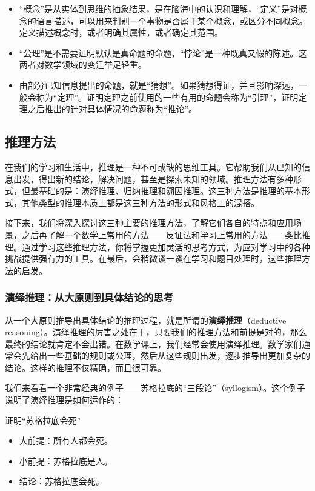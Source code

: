 \begin{itemize}
\item “概念”是从实体到思维的抽象结果，是在脑海中的认识和理解，“定义”是对概念的语言描述，可以用来判别一个事物是否属于某个概念，或区分不同概念。定义描述概念时，或者明确其属性，或者确定其范围。
\item “公理”是不需要证明默认是真命题的命题，“悖论”是一种既真又假的陈述。这两者对数学领域的变迁举足轻重。
\item 由部分已知信息提出的命题，就是“猜想”。如果猜想得证，并且影响深远，一般会称为“定理”。证明定理之前使用的一些有用的命题会称为“引理”，证明定理之后推出的针对具体情况的命题称为“推论”。
\end{itemize}

\subsection{推理方法}

在我们的学习和生活中，推理是一种不可或缺的思维工具。它帮助我们从已知的信息出发，得出新的结论，解决问题，甚至是探索未知的领域。推理方法有多种形式，但最基础的是：演绎推理、归纳推理和溯因推理。这三种方法是推理的基本形式，其他类型的推理本质上都是这三种方法的形式和风格上的混搭。

接下来，我们将深入探讨这三种主要的推理方法，了解它们各自的特点和应用场景，之后再了解一个数学上常用的方法——反证法和学习上常用的方法——类比推理。通过学习这些推理方法，你将掌握更加灵活的思考方式，为应对学习中的各种挑战提供强有力的工具。在最后，会稍微谈一谈在学习和题目处理时，这些推理方法的启发。%

\subsubsection{演绎推理：从大原则到具体结论的思考}

从一个大原则推导出具体结论的推理过程，就是所谓的\textbf{演绎推理}（deductive reasoning）。演绎推理的厉害之处在于，只要我们的推理方法和前提是对的，那么最终的结论就肯定不会出错。在数学课上，我们经常会使用演绎推理。数学家们通常会先给出一些基础的规则或公理，然后从这些规则出发，逐步推导出更加复杂的结论。这样的推理不仅精确，而且很可靠。

我们来看看一个非常经典的例子——苏格拉底的“三段论”（syllogism）。这个例子说明了演绎推理是如何运作的：

\begin{example}{证明“苏格拉底会死”}
\begin{itemize}
\item 大前提：所有人都会死。
\item 小前提：苏格拉底是人。
\item 结论：苏格拉底会死。
\end{itemize}
\end{example}

